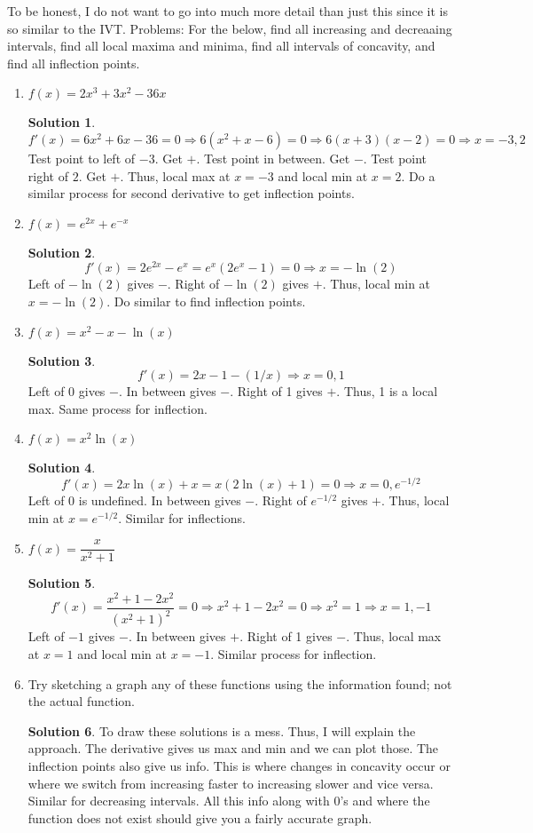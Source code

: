 \documentclass[10pt]{article}
\theoremstyle{Theorem}
\theoremstyle{definition}
\newtheorem*{solution}{Solution}
\theoremstyle{remark}
\theoremstyle{custom}
\begin{document}
To be honest, I do not want to go into much more detail than just this since it is so similar to the IVT.
\newpage
\noindent Problems: For the below, find all increasing and decreaaing intervals, find all local maxima and minima, find all intervals of concavity, and find all inflection points.
\begin{enumerate}[1.]
\item $f(x)=2x^3+3x^2-36x$
\begin{solution}
\[
f'(x)=6x^2+6x-36=0 \Rightarrow 6(x^2+x-6)=0 \Rightarrow 6(x+3)(x-2)=0 \Rightarrow x=-3, 2
\]
Test point to left of $-3$. Get $+$. Test point in between. Get $-$. Test point right of $2$. Get $+$. Thus, local max at $x=-3$ and local min at $x=2$. Do a similar process for second derivative to get inflection points.
\end{solution}
\item $f(x)=e^{2x}+e^{-x}$
\begin{solution}
\[
f'(x)=2e^{2x}-e^x=e^x(2e^x-1)=0 \Rightarrow x=-\ln(2)
\]
Left of $-\ln(2)$ gives $-$. Right of $-\ln(2)$ gives $+$. Thus, local min at $x=-\ln(2)$. Do similar to find inflection points.
\end{solution}
\item $f(x)=x^2-x-\ln(x)$
\begin{solution}
\[
f'(x)=2x-1-(1/x) \Rightarrow x=0,1
\]
Left of 0 gives $-$. In between gives $-$. Right of 1 gives $+$. Thus, 1 is a local max. Same process for inflection.
\end{solution}
\item $f(x)=x^2\ln(x)$
\begin{solution}
\[
f'(x)=2x\ln(x)+x=x(2\ln(x)+1)=0 \Rightarrow x=0, e^{-1/2}
\]
Left of 0 is undefined. In between gives $-$. Right of $e^{-1/2}$ gives $+$. Thus, local min at $x=e^{-1/2}$. Similar for inflections.
\end{solution}
\item $f(x)=\dfrac{x}{x^2+1}$
\begin{solution}
\[
f'(x)=\dfrac{x^2+1-2x^2}{(x^2+1)^2}=0 \Rightarrow x^2+1-2x^2=0 \Rightarrow x^2=1 \Rightarrow x=1,-1
\]
Left of $-1$ gives $-$. In between gives $+$. Right of 1 gives $-$. Thus, local max at $x=1$ and local min at $x=-1$. Similar process for inflection.
\end{solution}
\item Try sketching a graph any of these functions using the information found; not the actual function. 
\begin{solution}
To draw these solutions is a mess. Thus, I will explain the approach. The derivative gives us max and min and we can plot those. The inflection points also give us info. This is where changes in concavity occur or where we switch from increasing faster to increasing slower and vice versa. Similar for decreasing intervals.  All this info along with 0's and where the function does not exist should give you a fairly accurate graph.

\end{solution}
\end{enumerate}
\end{document}
